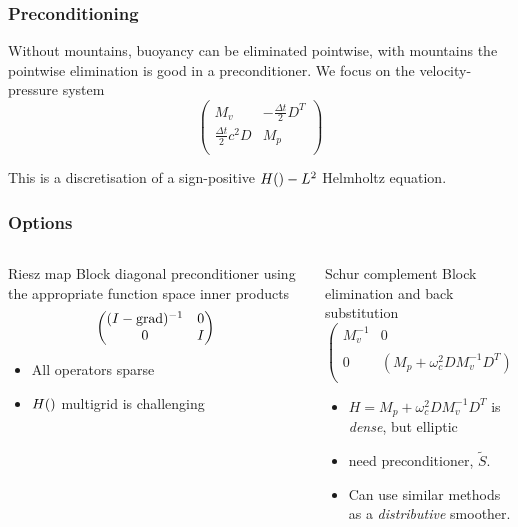 \documentclass[presentation]{beamer}
\DeclareMathOperator{\grad}{grad}
\let\div\relax
\DeclareMathOperator{\div}{div}
\begin{document}
\begin{frame}
  \frametitle{Preconditioning}
  Without mountains, buoyancy can be eliminated pointwise, with
  mountains the pointwise elimination is good in a preconditioner.  We
  focus on the velocity-pressure system
\begin{equation*}
\begin{pmatrix}
  M_v & -\frac{\Delta t}{2}D^T\\
  \frac{\Delta t}{2}c^2D & M_p\\
\end{pmatrix}
\end{equation*}

This is a discretisation of a sign-positive $H(\div)-L^2$ Helmholtz
equation.
\end{frame}

\begin{frame}[t]
  \frametitle{Options}
  \begin{columns}
    \begin{column}{0.52\textwidth}
      \begin{block}{Riesz map}
        Block diagonal preconditioner using the appropriate function
        space inner products
        \begin{equation*}
          \begin{pmatrix}
            (I - \grad \div)^{-1} & 0 \\
            0 & I\\
          \end{pmatrix}
        \end{equation*}
      \end{block}
      \begin{itemize}
      \item All operators sparse
      \item $H(\div)$ multigrid \parencite{Arnold:2000} is challenging
      \end{itemize}
    \end{column}
    \begin{column}{0.52\textwidth}
      \begin{block}{Schur complement}
        Block elimination and back substitution
        \begin{equation*}
          \begin{pmatrix}
            M_v^{-1} & 0 \\
            0 & (M_p + \omega_c^2 D M_v^{-1} D^T)^{-1}\\
          \end{pmatrix}
        \end{equation*}
      \end{block}
      \begin{itemize}
      \item $H = M_p +  \omega_c^2 D M_v^{-1} D^T$ is \emph{dense}, but elliptic
      \item need preconditioner, $\tilde{S}$.
      \item Can use similar methods as a \emph{distributive} smoother.
      \end{itemize}
    \end{column}
  \end{columns}
\end{frame}
\end{document}
